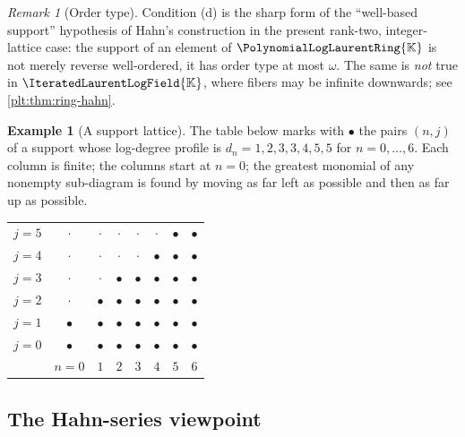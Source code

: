 \documentclass[11pt,oneside]{article}
\theoremstyle{plain}
\theoremstyle{definition}
\newtheorem{example}[theorem]{Example}
\theoremstyle{remark}
\newtheorem{remark}[theorem]{Remark}
\newcommand{\K}{\mathbb{K}}
\newcommand{\PLlau}{\PolynomialLogLaurentRing{\K}}       %
\newcommand{\PLit}{\IteratedLaurentLogField{\K}}         %
\begin{document}
\begin{remark}[Order type]
\label{plt:rmk:ring-order-type}
Condition (d) is the sharp form of the ``well-based support'' hypothesis of
Hahn's construction \cite{hahn,edgar-beginners} in the present rank-two,
integer-lattice case: the support of an element of \(\PLlau\) is not merely
reverse well-ordered, it has order type at most \(\omega\).  The same is
\emph{not} true in \(\PLit\), where fibers may be infinite downwards; see
\cref{plt:thm:ring-hahn}.
\end{remark}

\begin{example}[A support lattice]
\label{plt:ex:ring-support-lattice}
The table below marks with \(\bullet\) the pairs \((n,j)\) of a support whose
log-degree profile is \(d_n=1,2,3,3,4,5,5\) for \(n=0,\dots,6\).  Each column
is finite; the columns start at \(n=0\); the greatest monomial of any
nonempty sub-diagram is found by moving as far left as possible and then as
far up as possible.
\begin{center}
\begin{tabular}{r|ccccccc}
\(j=5\) & \(\cdot\) & \(\cdot\) & \(\cdot\) & \(\cdot\) & \(\cdot\)
        & \(\bullet\) & \(\bullet\)\\
\(j=4\) & \(\cdot\) & \(\cdot\) & \(\cdot\) & \(\cdot\) & \(\bullet\)
        & \(\bullet\) & \(\bullet\)\\
\(j=3\) & \(\cdot\) & \(\cdot\) & \(\bullet\) & \(\bullet\) & \(\bullet\)
        & \(\bullet\) & \(\bullet\)\\
\(j=2\) & \(\cdot\) & \(\bullet\) & \(\bullet\) & \(\bullet\) & \(\bullet\)
        & \(\bullet\) & \(\bullet\)\\
\(j=1\) & \(\bullet\) & \(\bullet\) & \(\bullet\) & \(\bullet\) & \(\bullet\)
        & \(\bullet\) & \(\bullet\)\\
\(j=0\) & \(\bullet\) & \(\bullet\) & \(\bullet\) & \(\bullet\) & \(\bullet\)
        & \(\bullet\) & \(\bullet\)\\
\hline
        & \(n=0\) & \(1\) & \(2\) & \(3\) & \(4\) & \(5\) & \(6\)
\end{tabular}
\end{center}
\end{example}

\subsection{The Hahn-series viewpoint}
\label{plt:sec:ring-hahn}
\end{document}
